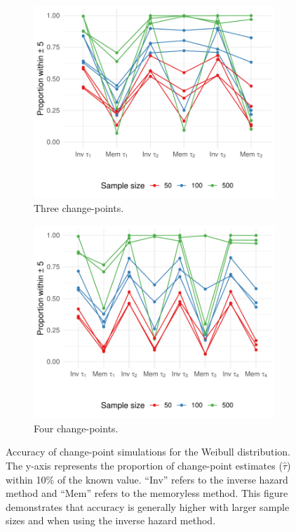 \begin{figure}[ht]
     \\
     \begin{subfigure}[b]{0.45\textwidth}
         \centering
         \includegraphics[width=\textwidth]{weib3_plplot.pdf}
         \caption{Three change-points.}
         \label{fig:weib3plplot}
     \end{subfigure}
     \hfill
     \begin{subfigure}[b]{0.45\textwidth}
         \centering
         \includegraphics[width=\textwidth]{weib4_plplot.pdf}
         \caption{Four change-points.}
         \label{fig:weib4plplot}
     \end{subfigure}
    \caption{Accuracy of change-point simulations for the Weibull distribution. The y-axis represents the proportion of change-point estimates ($\hat{\tau}$) within 10\% of the known value. ``Inv'' refers to the inverse hazard method and ``Mem'' refers to the memoryless method. This figure demonstrates that accuracy is generally higher with larger sample sizes and when using the inverse hazard method.}
    \label{fig:weibplplots}
\end{figure}

